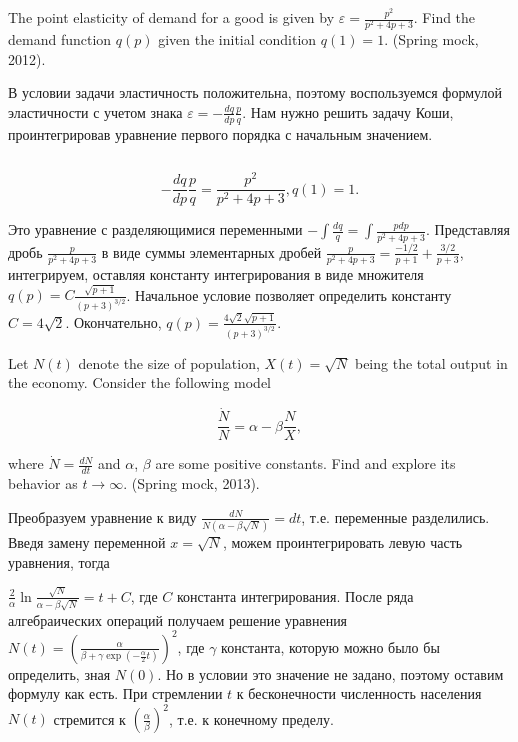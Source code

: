
\begin{problem}
The point elasticity of demand for a good is given by $\varepsilon =\frac{p^{2} }{p^{2} +4p+3} $. Find the demand function $q(p)$ given the initial condition $q(1)=1$. (Spring mock, 2012).
\end{problem}


\begin{solution}
В условии задачи эластичность положительна, поэтому воспользуемся формулой эластичности с учетом знака $\varepsilon =-\frac{dq}{dp} \frac{p}{q} $. Нам нужно решить задачу Коши, проинтегрировав уравнение первого порядка с начальным значением.

$ $

\[-\frac{dq}{dp} \frac{p}{q} =\frac{p^{2} }{p^{2} +4p+3} , q(1)=1.\] 

Это уравнение с разделяющимися переменными $-\int \frac{dq}{q} =\int \frac{pdp}{p^{2} +4p+3}   $. Представляя дробь $\frac{p}{p^{2} +4p+3} $ в виде суммы элементарных дробей $\frac{p}{p^{2} +4p+3} =\frac{-1/2}{p+1} +\frac{3/2}{p+3} $, интегрируем, оставляя константу интегрирования в виде множителя $q(p)=C\frac{\sqrt{p+1} }{(p+3)^{3/2} } $. Начальное условие позволяет определить константу $C=4\sqrt{2} $. Окончательно, $q(p)=\frac{4\sqrt{2} \sqrt{p+1} }{(p+3)^{3/2} } $.
\end{solution}

\begin{problem}
Let $N(t)$ denote the size of population, $X(t)=\sqrt{N} $ being the total output in the economy. Consider the following model

\[\frac{\dot{N}}{N} =\alpha -\beta \frac{N}{X} ,\] 

where $\dot{N}=\frac{dN}{dt} $ and $\alpha$, $\beta$ are some positive constants. Find  and explore its behavior as $t\to \infty $. (Spring mock, 2013).
\end{problem}


\begin{solution}
Преобразуем уравнение к виду $\frac{dN}{N(\alpha -\beta \sqrt{N} )} =dt$, т.е. переменные разделились. Введя замену переменной $x=\sqrt{N} $, можем проинтегрировать левую часть уравнения, тогда

$\frac{2}{\alpha } \ln \frac{\sqrt{N} }{\alpha -\beta \sqrt{N} } =t+C$, где $C$ константа интегрирования. После ряда алгебраических операций получаем решение уравнения $N(t)=\left(\frac{\alpha }{\beta +\gamma \exp (-\frac{\alpha }{2} t)} \right)^{2} $, где $\gamma $ константа, которую можно было бы определить, зная $N(0)$. Но в условии это значение не задано, поэтому оставим формулу как есть. При стремлении $t$ к бесконечности численность населения $N(t)$ стремится к $\left(\frac{\alpha }{\beta } \right)^{2} $, т.е. к конечному пределу.
\end{solution}


